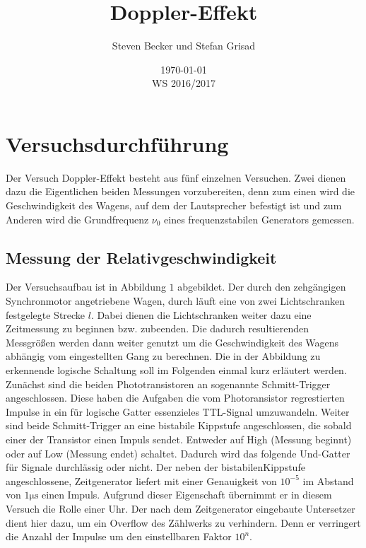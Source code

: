 \documentclass[parskip=half]{scrartcl} %
\author{Steven Becker und Stefan Grisad}
\title{Doppler-Effekt}
\date{\today\\WS 2016/2017}
\begin{document}
\maketitle
%
\section{Versuchsdurchführung}

Der Versuch Doppler-Effekt besteht aus fünf einzelnen Versuchen.
Zwei dienen dazu die Eigentlichen beiden Messungen vorzubereiten, denn 
zum einen wird die Geschwindigkeit des Wagens, auf dem der
Lautsprecher befestigt ist und zum Anderen wird die Grundfrequenz
$\nu_0$ eines 
frequenzstabilen Generators gemessen.

\subsection{Messung der Relativgeschwindigkeit}

%
%

Der Versuchsaufbau ist in Abbildung $1$ abgebildet. 
Der durch den zehgängigen Synchronmotor angetriebene Wagen, durch läuft eine 
von zwei Lichtschranken festgelegte Strecke $l$. Dabei dienen die Lichtschranken weiter dazu
eine Zeitmessung zu beginnen bzw. zubeenden. Die dadurch resultierenden Messgrößen
werden dann weiter genutzt um die Geschwindigkeit des Wagens abhängig vom eingestellten
Gang zu berechnen.
Die in der Abbildung zu erkennende logische Schaltung soll im Folgenden einmal kurz
erläutert werden.
Zunächst sind die beiden Phototransistoren an sogenannte Schmitt-Trigger angeschlossen.
Diese haben die Aufgaben die vom Photoransistor regrestierten Impulse in ein 
für logische Gatter essenzieles TTL-Signal umzuwandeln. Weiter sind beide Schmitt-Trigger an
eine bistabile Kippstufe angeschlossen, die sobald einer der Transistor einen Impuls sendet.
Entweder auf High (Messung beginnt) oder auf Low (Messung endet) schaltet. Dadurch wird 
das folgende Und-Gatter für Signale durchlässig oder nicht.
Der neben der bistabilenKippstufe angeschlossene, Zeitgenerator liefert mit einer Genauigkeit von
$10^{-5}$ im Abstand von $1\si{\micro\second}$ einen Impuls.
Aufgrund dieser Eigenschaft übernimmt er in diesem Versuch die Rolle einer Uhr.
Der nach dem Zeitgenerator eingebaute Untersetzer dient hier dazu, um 
ein Overflow des Zählwerks zu verhindern. Denn er verringert die Anzahl der Impulse um 
den einstellbaren Faktor $10^n$.
\end{document}

